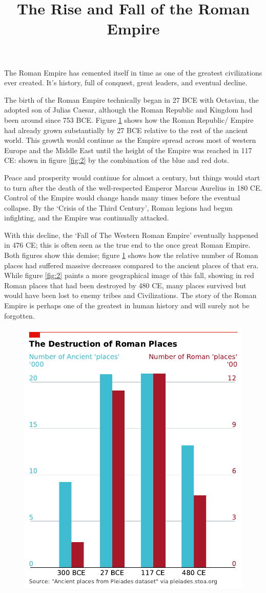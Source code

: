 \documentclass{article}
\title{The Rise and Fall of the Roman Empire}
\date{}
\begin{document}
\maketitle
\noindent The Roman Empire has cemented itself in time as one of the greatest civilizations ever created. It’s history, full of conquest, great leaders, and eventual decline. 
\newline

\noindent The birth of the Roman Empire technically began in 27 BCE with Octavian, the adopted son of Julias Caesar, although the Roman Republic and Kingdom had been around since 753 BCE. Figure \ref{fig:1} shows how the Roman Republic/ Empire had already grown substantially by 27 BCE relative to the rest of the ancient world. This growth would continue as the Empire spread across most of western Europe and the Middle East until the height of the Empire was reached in 117 CE: shown in figure \ref{fig:2} by the combination of the blue and red dots. 
\newline

\noindent Peace and prosperity would continue for almost a century, but things would start to turn after the death of the well-respected Emperor Marcus Aurelius in 180 CE. Control of the Empire would change hands many times before the eventual collapse. By the ‘Crisis of the Third Century’, Roman legions had begun infighting, and the Empire was continually attacked.
\newline

\noindent With this decline, the ‘Fall of The Western Roman Empire’ eventually happened in 476 CE; this is often seen as the true end to the once great Roman Empire. Both figures show this demise; figure \ref{fig:1} shows how the relative number of Roman places had suffered massive decreases compared to the ancient places of that era. While figure \ref{fig:2} paints a more geographical image of this fall, showing in red Roman places that had been destroyed by 480 CE, many places survived but would have been lost to enemy tribes and Civilizations. 
The story of the Roman Empire is perhaps one of the greatest in human history and will surely not be forgotten.


\begin{figure}[htbp]
\centering
\includegraphics[width=0.5\linewidth]{outputs/figures/figure-1.pdf}
\caption{\label{fig:1}}
\end{figure}
\end{document}
